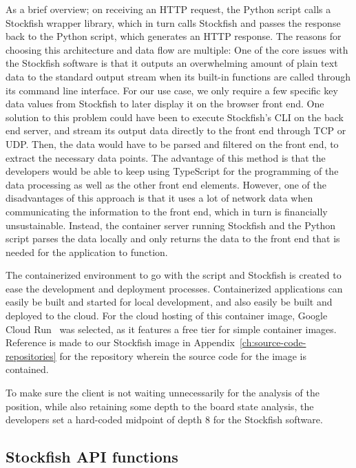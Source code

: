 As a brief overview; on receiving an HTTP request, the Python script calls a Stockfish wrapper library,
which in turn calls Stockfish and passes the response back to the Python script, which generates an HTTP response.
The reasons for choosing this architecture and data flow are multiple:
One of the core issues with the Stockfish software is that it outputs an overwhelming amount of plain text data to the
standard output stream when its built-in functions are called through its command line interface.
For our use case, we only require a few specific key data values from Stockfish to later display it on the browser front
end.
One solution to this problem could have been to execute Stockfish's CLI on the back end server, and stream its output
data directly to the front end through TCP or UDP\@.
Then, the data would have to be parsed and filtered on the front end, to extract the necessary data points.
The advantage of this method is that the developers would be able to keep using TypeScript for the programming of the
data processing as well as the other front end elements.
However, one of the disadvantages of this approach is that it uses a lot of network data when communicating the
information to the front end, which in turn is financially unsustainable.
Instead, the container server running Stockfish and the Python script parses the data locally and only returns the data
to the front end that is needed for the application to function.

The containerized environment to go with the script and Stockfish is created to ease the development and deployment
processes.
Containerized applications can easily be built and started for local development, and also easily be built and deployed
to the cloud.
For the cloud hosting of this container image, Google Cloud Run~\cite{google-cloud-run} was selected, as it features
a free tier for simple container images.
Reference is made to our Stockfish image in Appendix~\ref{ch:source-code-repositories} for the repository wherein the
source code for the image is contained.

To make sure the client is not waiting unnecessarily for the analysis of the position, while also retaining some depth
to the board state analysis, the developers set a hard-coded midpoint of depth 8 for the Stockfish software.

\subsection{Stockfish API functions}\label{subsec:stockfish-api-functions}

